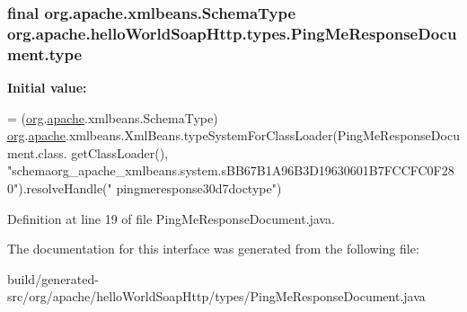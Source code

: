 \subsubsection[{type}]{\setlength{\rightskip}{0pt plus 5cm}final org.\+apache.\+xmlbeans.\+Schema\+Type org.\+apache.\+hello\+World\+Soap\+Http.\+types.\+Ping\+Me\+Response\+Document.\+type\hspace{0.3cm}{\ttfamily [static]}}\label{interfaceorg_1_1apache_1_1hello_world_soap_http_1_1types_1_1_ping_me_response_document_ae9fead5b85c74e008838569c237fcb14}
{\bfseries Initial value\+:}
\begin{DoxyCode}
= (\hyperlink{namespaceorg}{org}.\hyperlink{namespaceorg_1_1apache}{apache}.xmlbeans.SchemaType)
        \hyperlink{namespaceorg}{org}.\hyperlink{namespaceorg_1_1apache}{apache}.xmlbeans.XmlBeans.typeSystemForClassLoader(PingMeResponseDocument.class.
      getClassLoader(), \textcolor{stringliteral}{"schemaorg\_apache\_xmlbeans.system.sBB67B1A96B3D19630601B7FCCFC0F280"}).resolveHandle(\textcolor{stringliteral}{"
      pingmeresponse30d7doctype"})
\end{DoxyCode}


Definition at line 19 of file Ping\+Me\+Response\+Document.\+java.



The documentation for this interface was generated from the following file\+:\begin{DoxyCompactItemize}
\item 
build/generated-\/src/org/apache/hello\+World\+Soap\+Http/types/Ping\+Me\+Response\+Document.\+java\end{DoxyCompactItemize}
